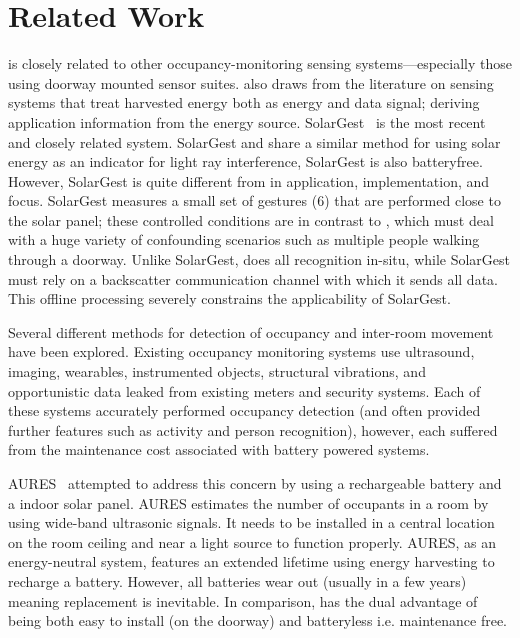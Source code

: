 \section{Related Work}
\label{sec:related}

\sysname is closely related to other occupancy-monitoring sensing systems---especially those using doorway mounted sensor suites.
\sysname also draws from the literature on sensing systems that treat harvested energy both as energy and data signal; deriving application information from the energy source.
SolarGest~\cite{ma2019solargest} is the most recent and closely related system. SolarGest and \sysname share a similar method for using solar energy as an indicator for light ray interference, SolarGest is also batteryfree. However, SolarGest is quite different from \sysname in application, implementation, and focus. SolarGest measures a small set of gestures (6) that are performed close to the solar panel; these controlled conditions are in contrast to \sysname, which must deal with a huge variety of confounding scenarios such as multiple people walking through a doorway. Unlike SolarGest, \sysname does all recognition in-situ, while SolarGest must rely on a backscatter communication channel with which it sends all data. This offline processing severely constrains the applicability of SolarGest.


Several different methods for detection of occupancy and inter-room movement have been explored. Existing occupancy monitoring systems use ultrasound\cite{hnat2012doorjamb}, imaging\cite{tyndall2016occupancy, teixeira2007lightweight}, wearables\cite{fishkin2005hands}, instrumented objects\cite{buettner2009activity}, structural vibrations\cite{pan2016occupant}, and opportunistic data leaked from existing meters and security systems\cite{yangoccupancy2014}.
Each of these systems accurately performed occupancy detection (and often provided further features such as activity and person recognition), however, each suffered from the maintenance cost associated with battery powered systems.

AURES~\cite{shih2016aures} attempted to address this concern by using a rechargeable battery and a indoor solar panel.
AURES estimates the number of occupants in a room by using wide-band ultrasonic signals.
It needs to be installed in a central location on the room ceiling and near a light source to function properly.
AURES, as an energy-neutral system, features an extended lifetime using energy harvesting to recharge a battery.
However, all batteries wear out (usually in a few years) meaning replacement is inevitable.
In comparison, \sysname has the dual advantage of being both easy to install (on the doorway) and batteryless i.e. maintenance free.

